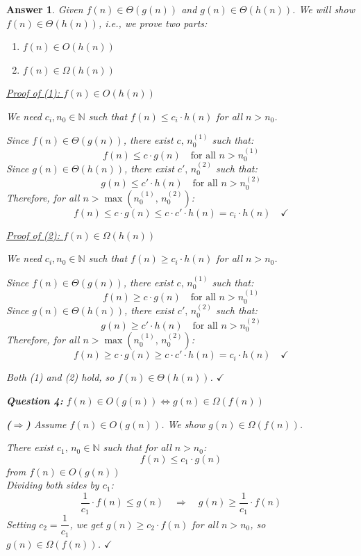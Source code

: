 \documentclass[a4paper]{article}
\theoremstyle{remarksStyle}
\theoremstyle{questionStyle}
\theoremstyle{answerStyle}
\newtheorem{answer}{Answer}
\begin{document}
\begin{answer}
\medskip
\noindent Given $f(n) \in \Theta(g(n))$ and $g(n) \in \Theta(h(n))$.
We will show $f(n) \in \Theta(h(n))$, i.e., we prove two parts:
\begin{enumerate}[(1)]
    \item $f(n) \in O(h(n))$
    \item $f(n) \in \Omega(h(n))$
\end{enumerate}

\medskip
\noindent\underline{Proof of (1): $f(n) \in O(h(n))$}

We need $c_i, n_0 \in \mathbb{N}$ such that $f(n) \leq c_i \cdot h(n)$ for all $n > n_0$.

Since $f(n) \in \Theta(g(n))$, there exist $c,\, n_0^{(1)}$ such that:
\[
    f(n) \leq c \cdot g(n) \quad \text{for all } n > n_0^{(1)}
\]
Since $g(n) \in \Theta(h(n))$, there exist $c',\, n_0^{(2)}$ such that:
\[
    g(n) \leq c' \cdot h(n) \quad \text{for all } n > n_0^{(2)}
\]
Therefore, for all $n > \max\!\left(n_0^{(1)},\, n_0^{(2)}\right)$:
\[
    f(n) \leq c \cdot g(n) \leq c \cdot c' \cdot h(n) = c_i \cdot h(n)
    \quad \checkmark
\]

\medskip
\noindent\underline{Proof of (2): $f(n) \in \Omega(h(n))$}

We need $c_i, n_0 \in \mathbb{N}$ such that $f(n) \geq c_i \cdot h(n)$ for all $n > n_0$.

Since $f(n) \in \Theta(g(n))$, there exist $c,\, n_0^{(1)}$ such that:
\[
    f(n) \geq c \cdot g(n) \quad \text{for all } n > n_0^{(1)}
\]
Since $g(n) \in \Theta(h(n))$, there exist $c',\, n_0^{(2)}$ such that:
\[
    g(n) \geq c' \cdot h(n) \quad \text{for all } n > n_0^{(2)}
\]
Therefore, for all $n > \max\!\left(n_0^{(1)},\, n_0^{(2)}\right)$:
\[
    f(n) \geq c \cdot g(n) \geq c \cdot c' \cdot h(n) = c_i \cdot h(n)
    \quad \checkmark
\]

\medskip
\noindent Both (1) and (2) hold, so $f(n) \in \Theta(h(n))$. $\checkmark$

\textbf{Question 4:}
\noindent $f(n) \in O(g(n)) \iff g(n) \in \Omega(f(n))$
 
\bigskip
\noindent\textbf{($\Rightarrow$)} Assume $f(n) \in O(g(n))$. We show $g(n) \in \Omega(f(n))$.
 
There exist $c_1,\, n_0 \in \mathbb{N}$ such that for all $n > n_0$:
\[f(n) \leq c_1 \cdot g(n)\] 
from $f(n) \in O(g(n))$ \\
Dividing both sides by $c_1$:
\[
    \frac{1}{c_1} \cdot f(n) \leq g(n)
    \quad\Longrightarrow\quad
    g(n) \geq \frac{1}{c_1} \cdot f(n)
\]
Setting $c_2 = \dfrac{1}{c_1}$, we get $g(n) \geq c_2 \cdot f(n)$ for all $n > n_0$,
so $g(n) \in \Omega(f(n))$. $\checkmark$
 

\end{answer}
\end{document}
